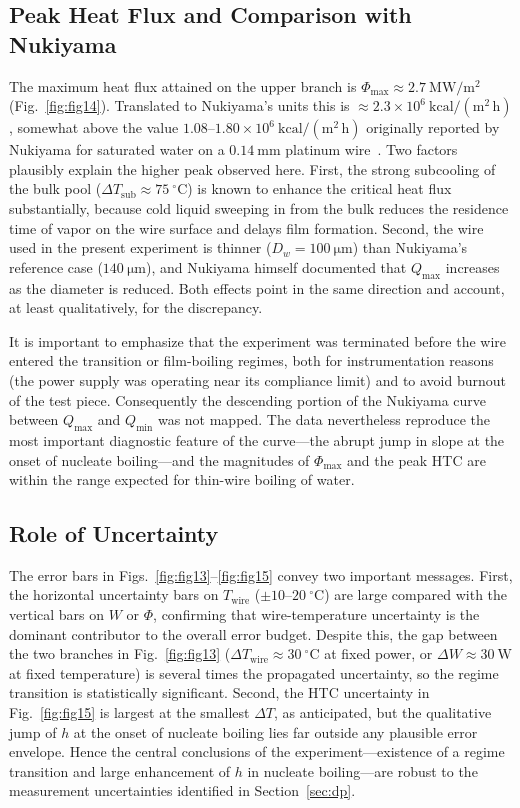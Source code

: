 \documentclass[conference]{IEEEtran}
\begin{document}
\subsection{Peak Heat Flux and Comparison with Nukiyama}
The maximum heat flux attained on the upper branch is $\Phi_{\max}\approx 2.7~\mathrm{MW/m^2}$ (Fig.~\ref{fig:fig14}). Translated to Nukiyama's units this is $\approx 2.3\times 10^{6}~\mathrm{kcal/(m^2\,h)}$, somewhat above the value $1.08$--$1.80\times 10^{6}~\mathrm{kcal/(m^2\,h)}$ originally reported by Nukiyama for saturated water on a $0.14~\mathrm{mm}$ platinum wire~\cite{nukiyama1966}. Two factors plausibly explain the higher peak observed here. First, the strong subcooling of the bulk pool ($\Delta T_{\mathrm{sub}} \approx 75~^{\circ}\mathrm{C}$) is known to enhance the critical heat flux substantially, because cold liquid sweeping in from the bulk reduces the residence time of vapor on the wire surface and delays film formation. Second, the wire used in the present experiment is thinner ($D_w = 100~\mathrm{\mu m}$) than Nukiyama's reference case ($140~\mathrm{\mu m}$), and Nukiyama himself documented that $Q_{\max}$ increases as the diameter is reduced. Both effects point in the same direction and account, at least qualitatively, for the discrepancy.

It is important to emphasize that the experiment was terminated before the wire entered the transition or film-boiling regimes, both for instrumentation reasons (the power supply was operating near its compliance limit) and to avoid burnout of the test piece. Consequently the descending portion of the Nukiyama curve between $Q_{\max}$ and $Q_{\min}$ was not mapped. The data nevertheless reproduce the most important diagnostic feature of the curve---the abrupt jump in slope at the onset of nucleate boiling---and the magnitudes of $\Phi_{\max}$ and the peak HTC are within the range expected for thin-wire boiling of water.

\subsection{Role of Uncertainty}
The error bars in Figs.~\ref{fig:fig13}--\ref{fig:fig15} convey two important messages. First, the horizontal uncertainty bars on $T_{\mathrm{wire}}$ ($\pm 10$--$20~^{\circ}\mathrm{C}$) are large compared with the vertical bars on $W$ or $\Phi$, confirming that wire-temperature uncertainty is the dominant contributor to the overall error budget. Despite this, the gap between the two branches in Fig.~\ref{fig:fig13} ($\Delta T_{\mathrm{wire}}\approx 30~^{\circ}\mathrm{C}$ at fixed power, or $\Delta W \approx 30~\mathrm{W}$ at fixed temperature) is several times the propagated uncertainty, so the regime transition is statistically significant. Second, the HTC uncertainty in Fig.~\ref{fig:fig15} is largest at the smallest $\Delta T$, as anticipated, but the qualitative jump of $h$ at the onset of nucleate boiling lies far outside any plausible error envelope. Hence the central conclusions of the experiment---existence of a regime transition and large enhancement of $h$ in nucleate boiling---are robust to the measurement uncertainties identified in Section~\ref{sec:dp}.
\end{document}
